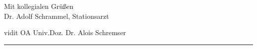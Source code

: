{Mit kollegialen Grüßen\vspace{2em}\\ Dr. Adolf Schrammel, Stationsarzt


vidit OA Univ.Doz. Dr. Alois Schremser
}

\vspace{2em}

\hrule












